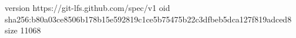 version https://git-lfs.github.com/spec/v1
oid sha256:b80a03ce8506b178b15e592819c1ce5b75475b22c3dfbeb5dca127f819adced8
size 11068

